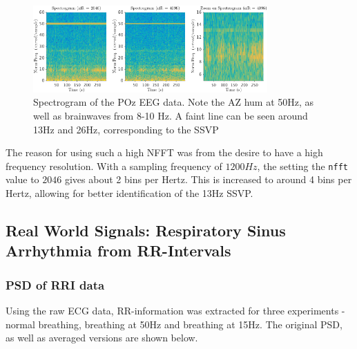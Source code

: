 \documentclass[main.tex]{subfiles}
\begin{document}
\begin{figure}[H]
	\centering
	\includegraphics[width=0.8\textwidth]{images/2-3-b-1.png}
	\caption{Spectrogram of the POz EEG data. Note the AZ hum at 50Hz, as well as brainwaves from 8-10 Hz. A faint line can be seen around 13Hz and 26Hz, corresponding to the SSVP}
	\label{fig:2-3-b}
\end{figure}

The reason for using such a high NFFT was from the desire to have a high frequency resolution. With a sampling frequency of $1200Hz$, the setting the {\tt nfft} value to $2046$ gives about 2 bins per Hertz. This is increased to around 4 bins per Hertz, allowing for better identification of the 13Hz SSVP.


\subsection{Real World Signals: Respiratory Sinus Arrhythmia from RR-Intervals}

\subsubsection{PSD of RRI data}

Using the raw ECG data, RR-information was extracted for three experiments - normal breathing, breathing at 50Hz and breathing at 15Hz. The original PSD, as well as averaged versions are shown below.
\end{document}
